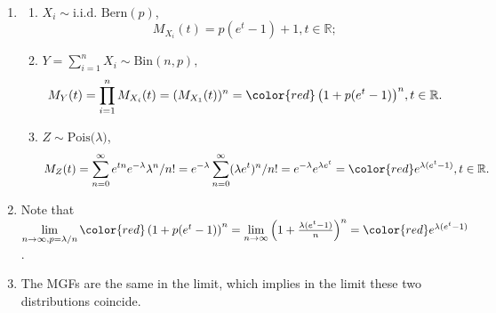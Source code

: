 \begin{Solution}{1.28}
~\\
		\begin{enumerate}		
			\item \begin{enumerate}
				\item $X_i\sim \text{i.i.d. Bern}(p)$, $$M_{X_i}(t)=p(e^t-1)+1, t\in \mathbb{R};$$
				\item $Y=\sum_{i=1}^{n}X_i\sim \text{Bin}(n,p),$
				$$M_{Y}(t)= \prod_{i=1}^{n}M_{X_i}(t) =(M_{X_1}(t))^n = {\color{red}\left(1+p(e^t-1)\right)^n}, t\in \mathbb{R}.$$
				\item[] $Z\sim\text{Pois($\lambda$)}$, $$M_{Z}(t)=\sum_{n=0}^\infty e^{tn}e^{-\lambda} \lambda^n/n!=e^{-\lambda} \sum_{n=0}^\infty  (\lambda e^t)^n/n! =e^{-\lambda}e^{\lambda e^t}    = {\color{red}e^{\lambda (e^t-1) }}, t\in \mathbb{R}.$$
			\end{enumerate}
			\item Note that $\lim\limits_{n\rightarrow \infty, p=\lambda/n}{\color{red}\left(1+p(e^t-1)\right)^n}= \lim\limits_{n\rightarrow \infty}\left(1+ \frac{\lambda(e^t-1)}{n}\right)^n=  {\color{red}e^{\lambda (e^t-1) }}$.
			\item{ The MGFs are the same in the limit}, which implies in the limit these two distributions coincide.
		\end{enumerate}~\\
	
\end{Solution}
